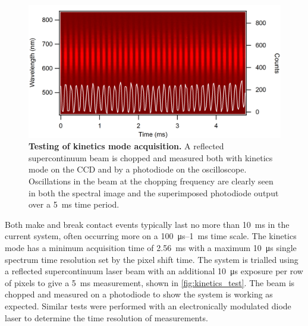 \documentclass[12pt, a4paper, twoside]{book}
\begin{document}
\begin{figure}[bt]
\centering
\includegraphics{figures/kinetics_test}
\caption[Testing of kinetics mode acquisition]{\textbf{Testing of kinetics mode acquisition.} A reflected supercontinuum beam is chopped and measured both with kinetics mode on the CCD and by a photodiode on the oscilloscope. Oscillations in the beam at the chopping frequency are clearly seen in both the spectral image and the superimposed photodiode output over a \SI{5}{ms} time period.}
\label{fig:kinetics_test}
\end{figure}

Both make and break contact events typically last no more than \SI{10}{ms} in the current system, often occurring more on a \SI{100}{\micro\second}--\SI{1}{ms} time scale. The kinetics mode has a minimum acquisition time of \SI{2.56}{ms} with a maximum \SI{10}{\micro\second} single spectrum time resolution set by the pixel shift time. The system is trialled using a reflected supercontinuum laser beam with an additional \SI{10}{\micro\second} exposure per row of pixels to give a \SI{5}{ms} measurement, shown in \autoref{fig:kinetics_test}. The beam is chopped and measured on a photodiode to show the system is working as expected. Similar tests were performed with an electronically modulated diode laser to determine the time resolution of measurements.
\end{document}
